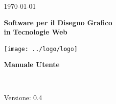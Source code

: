 \usepackage{multirow}
\title{\TITOLODOC}
\author{Marco Cunico}
 


\renewcommand{\insertversion}{0.4} %
\renewcommand{\TITOLODOC}{Manuale Utente} %
\renewcommand{\glosspath}{.\glossario} %
 
\begin{titlepage}
\begin{center}
  \begin{Large}  \today \end{Large}
\end{center}
 
\vspace{20pt}
 
\begin{center}
  \begin{Huge}
        \textbf{\ajax}
  \end{Huge}
\end{center}      
 
\begin{center}
  \begin{large}
        \textbf{Software per il Disegno Grafico\\ in Tecnologie Web}
  \end{large}
\end{center}      
 
\vspace{20pt}
 
\begin{center}
\texttt{[image: ../logo/logo]}
\end{center}
 
\vspace{170pt}
\begin{center} %
  \begin{Huge}
        \textbf{\TITOLODOC}
  \end{Huge}
      \\
\end{center}
\vspace{190pt}
\begin{center}
Versione: \insertversion
\end{center}
\end{titlepage}
 
